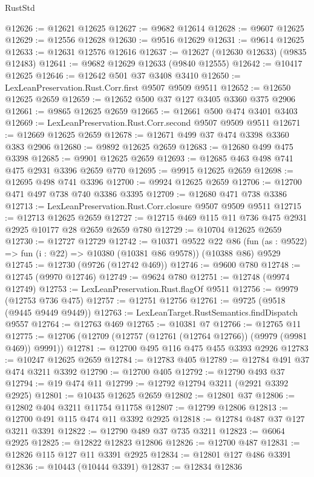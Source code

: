 \begin{lexlean}{RustStd}
\begin{coremodule}
@12626 := @12621 @12625
@12627 := @9682 @12614
@12628 := @9607 @12625
@12629 := @12556 @12628
@12630 := @9516 @12629
@12631 := @9614 @12625
@12633 := @12631 @12576 @12616
@12637 := @12627 (@12630 @12633) (@9835 @12483)
@12641 := @9682 @12629 @12633 (@9840 @12555)
@12642 := @10417 @12625
@12646 := @12642 @501 @37 @3408 @3410
@12650 := LexLeanPreservation.Rust.Corr.first @9507 @9509 @9511
@12652 := @12650 @12625 @2659
@12659 := @12652 @500 @37 @127 @3405 @3360 @375 @2906
@12661 := @9865 @12625 @2659
@12665 := @12661 @500 @474 @3401 @3403
@12669 := LexLeanPreservation.Rust.Corr.second @9507 @9509 @9511
@12671 := @12669 @12625 @2659
@12678 := @12671 @499 @37 @474 @3398 @3360 @383 @2906
@12680 := @9892 @12625 @2659
@12683 := @12680 @499 @475 @3398
@12685 := @9901 @12625 @2659
@12693 := @12685 @463 @498 @741 @475 @2931 @3396 @2659 @770
@12695 := @9915 @12625 @2659
@12698 := @12695 @498 @741 @3396
@12700 := @9924 @12625 @2659
@12706 := @12700 @471 @497 @738 @740 @3386 @3395
@12709 := @12680 @471 @738 @3386
@12713 := LexLeanPreservation.Rust.Corr.closure @9507 @9509 @9511
@12715 := @12713 @12625 @2659
@12727 := @12715 @469 @115 @11 @736 @475 @2931 @2925 @10177 @28 @2659 @2659 @780
@12729 := @10704 @12625 @2659
@12730 := @12727 @12729
@12742 := @10371
    @9522
    @22
    @86
    (fun (as : @9522) => fun (i : @22) => @10380 (@10381 @86 @9578))
    (@10388 @86)
    @9529
@12745 := @12730 (@9726 (@12742 @469))
@12746 := @9600 @780
@12748 := @12745 (@9970 @12746)
@12749 := @9624 @780
@12751 := @12748 (@9974 @12749)
@12753 := LexLeanPreservation.Rust.flagOf @9511
@12756 := @9979 (@12753 @736 @475)
@12757 := @12751 @12756
@12761 := @9725 (@9518 (@9445 @9449 @9449))
@12763 := LexLeanTarget.RustSemantics.findDispatch @9557
@12764 := @12763 @469
@12765 := @10381 @7
@12766 := @12765 @11
@12775 := @12706 (@12709 (@12757 (@12761 (@12764 @12766)) (@9979 (@9981 @469)) @9991))
@12781 := @12700 @495 @116 @475 @455 @3393 @2926
@12783 := @10247 @12625 @2659
@12784 := @12783 @405
@12789 := @12784 @491 @37 @474 @3211 @3392
@12790 := @12700 @405
@12792 := @12790 @493 @37
@12794 := @19 @474 @11
@12799 := @12792 @12794 @3211 (@2921 @3392 @2925)
@12801 := @10435 @12625 @2659
@12802 := @12801 @37
@12806 := @12802 @404 @3211 @11754 @11758
@12807 := @12799 @12806
@12813 := @12700 @491 @115 @474 @11 @3392 @2925
@12818 := @12784 @487 @37 @127 @3211 @3391
@12822 := @12790 @489 @37 @735 @3211
@12823 := @6064 @2925
@12825 := @12822 @12823 @12806
@12826 := @12700 @487
@12831 := @12826 @115 @127 @11 @3391 @2925
@12834 := @12801 @127 @486 @3391
@12836 := @10443 (@10444 @3391)
@12837 := @12834 @12836

\end{coremodule}
\end{lexlean}
